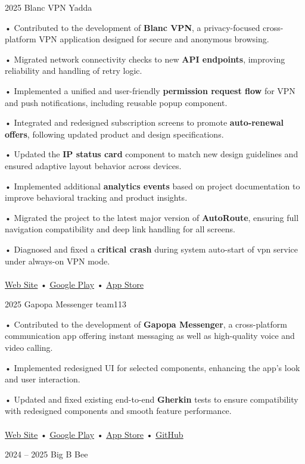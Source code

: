 \documentclass[9pt]{developercv} %
\begin{document}
\begin{entrylist}
    \entry
    {2025}
    {Blanc VPN}
    {Yadda}
    {

        • Contributed to the development of \textbf{Blanc VPN}, a privacy-focused cross-platform VPN application designed for secure and anonymous browsing.

        • Migrated network connectivity checks to new \textbf{API endpoints}, improving reliability and handling of retry logic.

        • Implemented a unified and user-friendly \textbf{permission request flow} for VPN and push notifications, including reusable popup component.

        • Integrated and redesigned subscription screens to promote \textbf{auto-renewal offers}, following updated product and design specifications.

        • Updated the \textbf{IP status card} component to match new design guidelines and ensured adaptive layout behavior across devices.

        • Implemented additional \textbf{analytics events} based on project documentation to improve behavioral tracking and product insights.

        • Migrated the project to the latest major version of \textbf{AutoRoute}, ensuring full navigation compatibility and deep link handling for all screens.

        • Diagnosed and fixed a \textbf{critical crash} during system auto-start of vpn service under always-on VPN mode.
        \\
        \\
        \href{https://blancvpn.com/}{\uline{Web Site}}
        •
        \href{https://play.google.com/store/apps/details?id=com.blancvpn.app}{\uline{Google Play}}
        •
        \href{https://apps.apple.com/us/app/blancvpn/id6744585772}{\uline{App Store}}
        \\
    }
    \entry
    {2025}
    {Gapopa Messenger}
    {team113}
    {

        • Contributed to the development of \textbf{Gapopa Messenger}, a cross-platform communication app offering instant messaging as well as high-quality voice and video calling.

        • Implemented redesigned UI for selected components, enhancing the app’s look and user interaction.

        • Updated and fixed existing end-to-end \textbf{Gherkin} tests to ensure compatibility with redesigned components and smooth feature performance.
        \\
        \\
        \href{https://gapopa.org/}{\uline{Web Site}}
        •
        \href{https://play.google.com/store/apps/details?id=com.team113.messenger}{\uline{Google Play}}
        •
        \href{https://apps.apple.com/us/app/gapopa/id6444211477}{\uline{App Store}}
        •
        \href{https://github.com/team113/messenger}{\uline{GitHub}}
        \\
    }
    \entry
    {2024 -- 2025}
    {Big B}
    {Bee}
    {

}
\end{entrylist}
\end{document}
